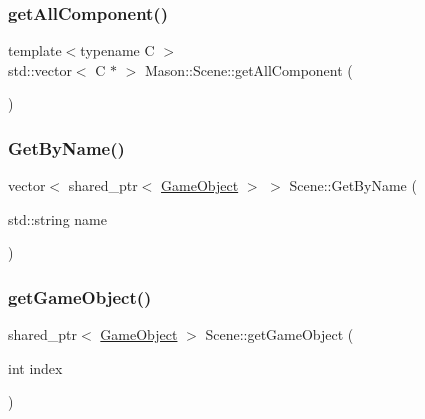 \hypertarget{class_mason_1_1_scene_a889caa86c1c4c8fad9416c7240148232}{}\label{class_mason_1_1_scene_a889caa86c1c4c8fad9416c7240148232} 
\subsubsection{\texorpdfstring{get\+All\+Component()}{getAllComponent()}}
{\footnotesize\ttfamily template$<$typename C $>$ \\
std\+::vector$<$ C $\ast$ $>$ Mason\+::\+Scene\+::get\+All\+Component (\begin{DoxyParamCaption}{ }\end{DoxyParamCaption})}

\hypertarget{class_mason_1_1_scene_a684a224fe56794d0db86da99947a6fac}{}\label{class_mason_1_1_scene_a684a224fe56794d0db86da99947a6fac} 
\subsubsection{\texorpdfstring{Get\+By\+Name()}{GetByName()}}
{\footnotesize\ttfamily vector$<$ shared\+\_\+ptr$<$ \hyperlink{class_mason_1_1_game_object}{Game\+Object} $>$ $>$ Scene\+::\+Get\+By\+Name (\begin{DoxyParamCaption}\item[{std\+::string}]{name }\end{DoxyParamCaption})\hspace{0.3cm}{\ttfamily [static]}}

\hypertarget{class_mason_1_1_scene_ae13738888d4f00135fb827639f87239b}{}\label{class_mason_1_1_scene_ae13738888d4f00135fb827639f87239b} 
\subsubsection{\texorpdfstring{get\+Game\+Object()}{getGameObject()}}
{\footnotesize\ttfamily shared\+\_\+ptr$<$ \hyperlink{class_mason_1_1_game_object}{Game\+Object} $>$ Scene\+::get\+Game\+Object (\begin{DoxyParamCaption}\item[{int}]{index }\end{DoxyParamCaption})}

